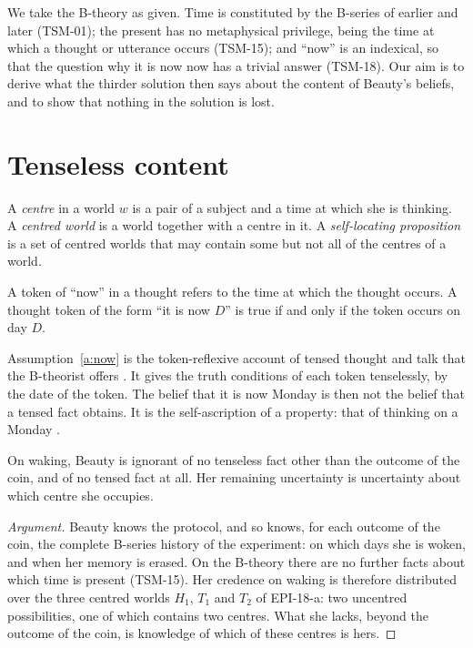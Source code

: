 \documentclass{situationist-preprint}
\begin{document}
We take the B-theory as given. Time is constituted by the B-series of earlier and later (TSM-01); the present has no metaphysical privilege, being the time at which a thought or utterance occurs (TSM-15); and \enquote{now} is an indexical, so that the question why it is now now has a trivial answer (TSM-18). Our aim is to derive what the thirder solution then says about the content of Beauty's beliefs, and to show that nothing in the solution is lost.

\section{Tenseless content}

\begin{definition}\label{d:centre}
A \emph{centre} in a world $w$ is a pair of a subject and a time at which she is thinking. A \emph{centred world} is a world together with a centre in it. A \emph{self-locating proposition} is a set of centred worlds that may contain some but not all of the centres of a world.
\end{definition}

\begin{assumption}\label{a:now}
A token of \enquote{now} in a thought refers to the time at which the thought occurs. A thought token of the form \enquote{it is now $D$} is true if and only if the token occurs on day $D$.
\end{assumption}

Assumption~\ref{a:now} is the token-reflexive account of tensed thought and talk that the B-theorist offers \citep{Mellor1998}. It gives the truth conditions of each token tenselessly, by the date of the token. The belief that it is now Monday is then not the belief that a tensed fact obtains. It is the self-ascription of a property: that of thinking on a Monday \citep{Lewis1979}.

\begin{proposition}\label{p:notensed}
On waking, Beauty is ignorant of no tenseless fact other than the outcome of the coin, and of no tensed fact at all. Her remaining uncertainty is uncertainty about which centre she occupies.
\end{proposition}

\begin{proof}[Argument]
Beauty knows the protocol, and so knows, for each outcome of the coin, the complete B-series history of the experiment: on which days she is woken, and when her memory is erased. On the B-theory there are no further facts about which time is present (TSM-15). Her credence on waking is therefore distributed over the three centred worlds $H_1$, $T_1$ and $T_2$ of EPI-18-a: two uncentred possibilities, one of which contains two centres. What she lacks, beyond the outcome of the coin, is knowledge of which of these centres is hers.
\end{proof}
\end{document}
